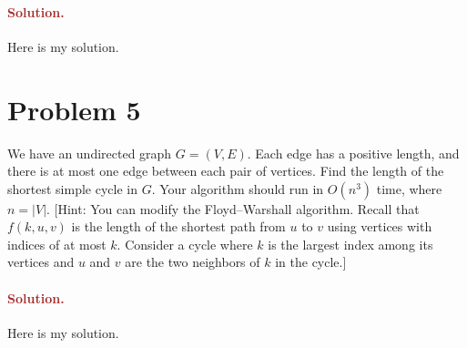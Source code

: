 \paragraph{\textcolor{brown}{Solution.}}
Here is my solution.


\section*{Problem 5}
We have an undirected graph $G = (V, E)$. Each edge has a positive length, and there is at most one edge between each pair of vertices. Find the length of the shortest simple cycle in $G$. Your algorithm should run in $O(n^3)$ time, where $n = |V|$. [Hint: You can modify the Floyd--Warshall algorithm. Recall that $f(k, u, v)$ is the length of the shortest path from $u$ to $v$ using vertices with indices of at most $k$. Consider a cycle where $k$ is the largest index among its vertices and $u$ and $v$ are the two neighbors of $k$ in the cycle.]

\paragraph{\textcolor{brown}{Solution.}}
Here is my solution.

